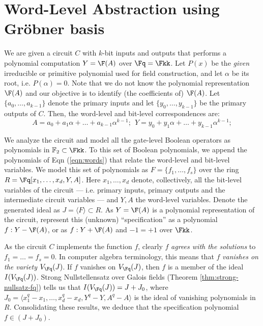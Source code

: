 \section{Word-Level Abstraction using Gr\"obner basis}
\label{sec:theory}
We are given a circuit $C$ with $k$-bit inputs and outputs that
performs a polynomial computation $Y = \F(A)$ over $\Fq = \Fkk$. Let
$P(x)$ be the {\it given} irreducible or primitive polynomial used for
field construction, and let $\alpha$ be its root, i.e. $P(\alpha) = 0
$. Note that we do not know the polynomial representation
$\F(A)$ and our objective is to identify (the coefficients of)
$\F(A)$. Let $\{a_0, \dots, a_{k-1}\}$ denote the primary inputs and
let $\{y_0, \dots, y_{k-1}\}$ be the primary outputs of $C$. Then, the
word-level and bit-level correspondences are: 
\begin{equation}
\label{eqn:words}
 A = a_0 + a_1 \alpha + \dots + a_{k-1} \alpha^{k-1}; ~~ Y = y_0 +
y_1 \alpha + \dots + y_{k-1} \alpha^{k-1};
\end{equation}

We analyze the circuit and model all the gate-level Boolean operators
as polynomials in ${\mathbb{F}}_2 \subset \Fkk$. To this set of
Boolean polynomials, we append the polynomials of Eqn
(\ref{eqn:words}) that relate the word-level and bit-level
variables. We model this set of polynomials as $F = \{f_1, \dots,
f_s\}$ over the ring $R = \Fq[x_1, \dots, x_d, Y, A]$. Here $x_1,
\dots, x_d$ denote, collectively, all the bit-level variables of the
circuit --- i.e. primary inputs, primary outputs and the intermediate
circuit variables --- and $Y, A$ the word-level variables. Denote the
generated ideal as $J = \langle F \rangle \subset R$. As $Y = \F(A)$
is a polynomial representation of the circuit, represent this (unknown)
``specification'' as a polynomial $f: Y - \F(A)$, or as $f: Y + \F(A)$
and $-1 = +1$ over $\Fkk$.  

As the circuit $C$ implements the function $f$, clearly $f$ {\it
  agrees with the solutions} to $f_1 = \dots = f_s = 0$. In computer
algebra terminology, this means that $f$ {\it vanishes on the variety} 
$V_{\Fq}(J)$. If $f$ vanishes on $V_{\Fq}(J)$, then $f$ is a member of
the ideal $I(V_{\Fq}(J))$. Strong Nullstellensatz over Galois fields
(Theorem \ref{thm:strong-nullsatz-fq}) tells us that $I(V_{\Fq}(J)) =
J + J_0$, where $J_0 = \langle x_1^q - x_1, \dots, x_d^q - x_d, Y^q -
Y, A^q - A \rangle$ is the ideal of vanishing polynomials in
$R$. Consolidating these results, we deduce that the specification
polynomial $f \in (J+J_0)$. 

